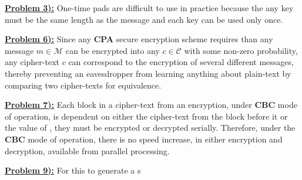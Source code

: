 \documentclass{article}[12]
\numberwithin{equation}{section}
\newcommand{\numbpr}[1]{\setcounter{section}{#1} \setcounter{equation}{0}}
\newcommand{\prob}[1]{\textbf{\underline{Problem #1):}}}
\begin{document}
\begin{flushleft}





\vspace{0.25 in}





\vspace{0.25in}


\numbpr{3}
\prob{3} One-time pads are difficult to use in practice because the any key must be the same length as the message and each key can be used only once. \newline


\vspace{0.25in}





\vspace{0.25in}





\vspace{0.25in}


\numbpr{6} 
\prob{6} Since any \textbf{CPA} secure encryption scheme requires than any message $m \in \mathcal{M}$ can be encrypted into any $c \in \mathcal{C}$ with some non-zero probability, any cipher-text $c$ can correspond to the encryption of several different messages, thereby preventing an eavesdropper from learning anything about plain-text by comparing two cipher-texts for equivalence. \newline


\vspace{0.25in}


\numbpr{7}
\prob{7} Each block in a cipher-text from an encryption, under \textbf{CBC} mode of operation, is dependent on either the cipher-text from the block before it or the value of , they must be encrypted or decrypted serially.  Therefore, under the \textbf{CBC} mode of operation, there is no speed increase, in either encryption and decryption, available from parallel processing. \newline


\vspace{0.25in}





\vspace{0.25in}


\numbpr{9}
\prob{9}  For this to generate a s







\end{flushleft}
\end{document}
